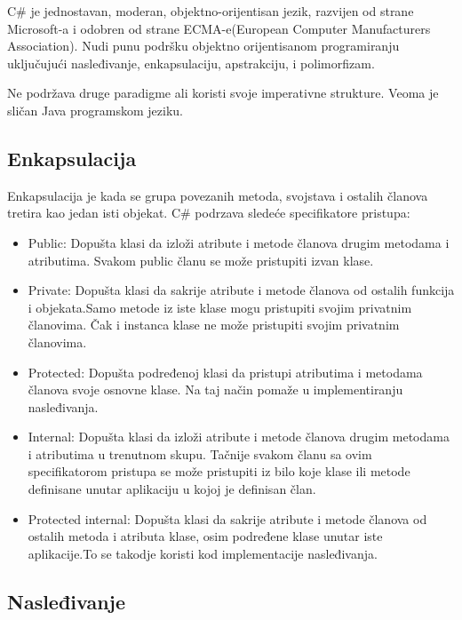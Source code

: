 \documentclass[a4paper]{article}
\begin{document}
{C\# je jednostavan, moderan, objektno-orijentisan jezik, razvijen od strane Microsoft-a i  odobren od strane ECMA-e(European Computer Manufacturers Association).  Nudi punu podršku objektno orijentisanom programiranju uključujući nasleđivanje, enkapsulaciju, apstrakciju, i polimorfizam.

Ne podržava druge paradigme ali koristi svoje imperativne strukture.
Veoma je sličan Java programskom jeziku.

\subsection{Enkapsulacija}
\label{subsec:csharpEnkapsulacija}

Enkapsulacija je kada se grupa povezanih metoda, svojstava i ostalih članova tretira kao jedan isti objekat.
C\# podrzava sledeće specifikatore pristupa:
\begin{itemize}
\item Public:
Dopušta klasi da izloži atribute i metode članova drugim metodama i atributima. Svakom public članu se može pristupiti izvan klase.

\item Private:
Dopušta klasi da sakrije atribute i metode članova od ostalih funkcija i objekata.Samo metode iz iste klase mogu pristupiti svojim privatnim članovima.  Čak i instanca klase ne može pristupiti svojim privatnim članovima.

\item Protected:
Dopušta podređenoj klasi da pristupi  atributima i metodama članova svoje osnovne klase. Na taj način pomaže u implementiranju nasleđivanja.

\item Internal:
Dopušta klasi da izloži atribute i metode članova drugim metodama i atributima u trenutnom skupu. Tačnije svakom članu sa ovim specifikatorom pristupa se može pristupiti iz bilo koje klase ili metode definisane unutar aplikaciju u kojoj je definisan član.

\item Protected internal:
Dopušta klasi da sakrije atribute i metode članova od ostalih metoda i atributa klase, osim podređene klase unutar iste aplikacije.To se takodje koristi kod implementacije nasleđivanja.
\end{itemize}

\subsection{Nasleđivanje}
\label{subsec:csharpNasledjivanje}

}
\end{document}
